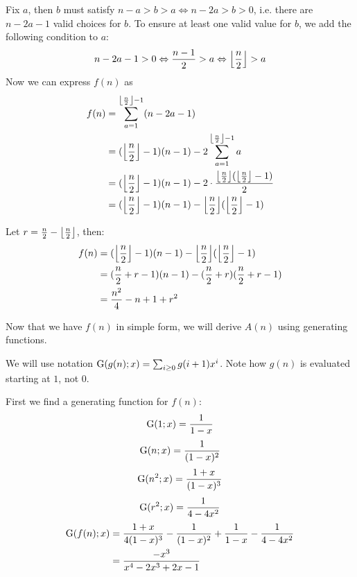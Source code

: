 \documentclass{article}
\begin{document}
Fix $a$, then $b$ must satisfy $n-a > b > a \Leftrightarrow n-2a > b > 0$, i.e. there are $n-2a-1$ valid
choices for $b$. To ensure at least one valid value for $b$, we add the following condition to $a$:
\begin{equation*}
n-2a-1 > 0 \Leftrightarrow \frac{n-1}{2} > a \Leftrightarrow \floor*{\frac{n}{2}} > a
\end{equation*}
Now we can express $f(n)$ as
\begin{equation}
\begin{split}
	f(n) & = \sum_{a=1}^{\floor*{\frac{n}{2}}-1}(n-2a-1) \\
	     & = (\floor*{\frac{n}{2}}-1)(n-1) -2\sum_{a=1}^{\floor*{\frac{n}{2}}-1}a \\
	     & = (\floor*{\frac{n}{2}}-1)(n-1) -2 \cdot \frac{\Half(\Half-1)}{2} \\
	     & = (\floor*{\frac{n}{2}}-1)(n-1) - \Half(\Half-1) \\
\end{split}
\end{equation}

Let $r = \frac{n}{2} - \Half$, then:
\begin{equation}
\begin{split}
	f(n) & = (\Half-1)(n-1) - \Half(\Half-1) \\
	     & = (\frac{n}{2}+r-1)(n-1) - (\frac{n}{2}+r)(\frac{n}{2}+r-1) \\
	     & = \frac{n^2}{4} - n + 1 + r^2 \\
\end{split}
\end{equation}

Now that we have $f(n)$ in simple form, we will derive $A(n)$ using generating functions.

We will use notation $\G(g(n); x) = \sum_{i \geq 0}g(i+1)x^i$. Note how $g(n)$ is evaluated starting at $1$, not $0$.

First we find a generating function for $f(n)$:
\begin{equation}
\G(1; x) = \frac{1}{1-x}
\end{equation}
\begin{equation}
\G(n; x) = \frac{1}{(1-x)^2}
\end{equation}
\begin{equation}
\G(n^2; x) = \frac{1+x}{(1-x)^3}
\end{equation}
\begin{equation}
\G(r^2; x) = \frac{1}{4-4x^2}
\end{equation}
\begin{equation}
\begin{split}
	\G(f(n); x) & = \frac{1+x}{4(1-x)^3} - \frac{1}{(1-x)^2} + \frac{1}{1-x} - \frac{1}{4-4x^2}\\
	            & = \frac{-x^3}{x^4 - 2x^3 + 2x - 1}
\end{split}
\end{equation}
\end{document}
